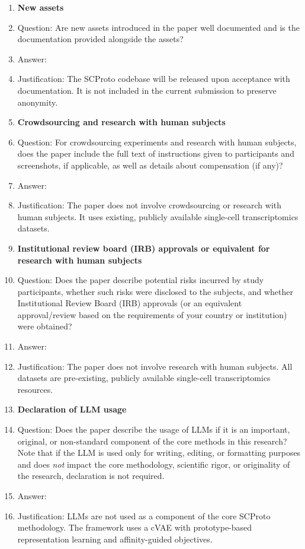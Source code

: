 \begin{enumerate}
\item {\bf New assets}
    \item[] Question: Are new assets introduced in the paper well documented and is the documentation provided alongside the assets?
    \item[] Answer: \answerNo{}
    \item[] Justification: The SCProto codebase will be released upon acceptance with documentation. It is not included in the current submission to preserve anonymity.

\item {\bf Crowdsourcing and research with human subjects}
    \item[] Question: For crowdsourcing experiments and research with human subjects, does the paper include the full text of instructions given to participants and screenshots, if applicable, as well as details about compensation (if any)?
    \item[] Answer: \answerNA{}
    \item[] Justification: The paper does not involve crowdsourcing or research with human subjects. It uses existing, publicly available single-cell transcriptomics datasets.

\item {\bf Institutional review board (IRB) approvals or equivalent for research with human subjects}
    \item[] Question: Does the paper describe potential risks incurred by study participants, whether such risks were disclosed to the subjects, and whether Institutional Review Board (IRB) approvals (or an equivalent approval/review based on the requirements of your country or institution) were obtained?
    \item[] Answer: \answerNA{}
    \item[] Justification: The paper does not involve research with human subjects. All datasets are pre-existing, publicly available single-cell transcriptomics resources.

\item {\bf Declaration of LLM usage}
    \item[] Question: Does the paper describe the usage of LLMs if it is an important, original, or non-standard component of the core methods in this research? Note that if the LLM is used only for writing, editing, or formatting purposes and does \emph{not} impact the core methodology, scientific rigor, or originality of the research, declaration is not required.
    \item[] Answer: \answerNA{}
    \item[] Justification: LLMs are not used as a component of the core SCProto methodology. The framework uses a cVAE with prototype-based representation learning and affinity-guided objectives.

\end{enumerate}
